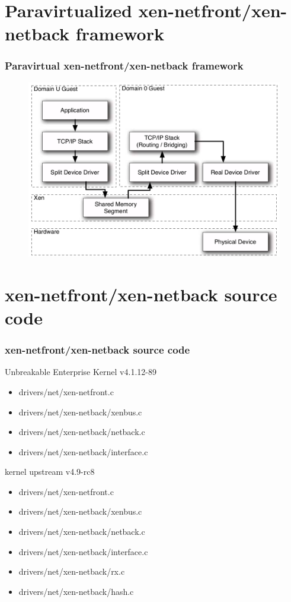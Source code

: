 \documentclass[aspectratio=169]{beamer}
\begin{document}
\section{Paravirtualized xen-netfront/xen-netback framework}
\begin{frame}
\frametitle{Paravirtual xen-netfront/xen-netback framework}
\begin{figure}
\includegraphics[width=0.7\linewidth]{figures/xennet1.pdf}
\end{figure}
\end{frame}


\section{xen-netfront/xen-netback source code}
\begin{frame}
\frametitle{xen-netfront/xen-netback source code}
\begin{block}{Unbreakable Enterprise Kernel v4.1.12-89}
\begin{itemize}
\item drivers/net/xen-netfront.c
\item drivers/net/xen-netback/xenbus.c
\item drivers/net/xen-netback/netback.c
\item drivers/net/xen-netback/interface.c
\end{itemize}
\end{block}
\begin{block}{kernel upstream v4.9-rc8}
\begin{itemize}
\item drivers/net/xen-netfront.c
\item drivers/net/xen-netback/xenbus.c
\item drivers/net/xen-netback/netback.c
\item drivers/net/xen-netback/interface.c
\item drivers/net/xen-netback/rx.c
\item drivers/net/xen-netback/hash.c
\end{itemize}
\end{block}
\end{frame}
\end{document}
